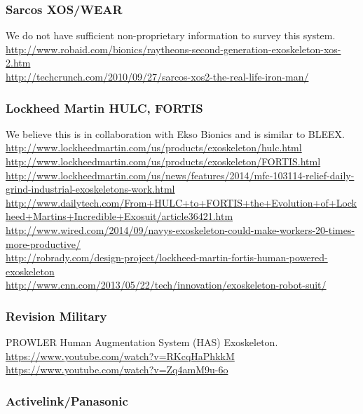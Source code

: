 \subsubsection{Sarcos XOS/WEAR}

\noindent
We do not have sufficient non-proprietary information to survey
this system.\\
\url{http://www.robaid.com/bionics/raytheons-second-generation-exoskeleton-xos-2.htm}\\
\url{http://techcrunch.com/2010/09/27/sarcos-xos2-the-real-life-iron-man/}\\

\subsubsection{Lockheed Martin HULC, FORTIS}

\noindent
We believe this is in collaboration with Ekso Bionics and is similar
to BLEEX.\\
\url{http://www.lockheedmartin.com/us/products/exoskeleton/hulc.html}\\
\url{http://www.lockheedmartin.com/us/products/exoskeleton/FORTIS.html}\\
\url{http://www.lockheedmartin.com/us/news/features/2014/mfc-103114-relief-daily-grind-industrial-exoskeletons-work.html}\\
\url{http://www.dailytech.com/From+HULC+to+FORTIS+the+Evolution+of+Lockheed+Martins+Incredible+Exosuit/article36421.htm}\\
\url{http://www.wired.com/2014/09/navys-exoskeleton-could-make-workers-20-times-more-productive/}\\
\url{http://robrady.com/design-project/lockheed-martin-fortis-human-powered-exoskeleton}\\
\url{http://www.cnn.com/2013/05/22/tech/innovation/exoskeleton-robot-suit/}

\subsubsection{Revision Military}

\noindent
PROWLER Human Augmentation System (HAS) Exoskeleton.\\
\url{https://www.youtube.com/watch?v=RKcqHaPhkkM}\\
\url{https://www.youtube.com/watch?v=Zq4amM9u-6o}\\

\subsubsection{Activelink/Panasonic} 

